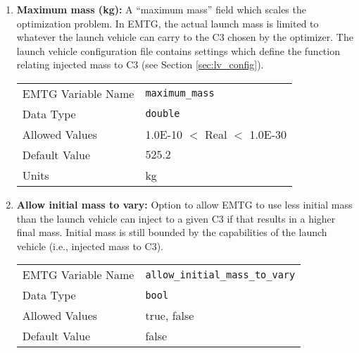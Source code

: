 \begin{enumerate}
    \item \textbf{Maximum mass (kg):} A ``maximum mass'' field which scales the optimization problem. In \ac{EMTG}, the actual launch mass is limited to whatever the launch vehicle can carry to the C3 chosen by the optimizer. The launch vehicle configuration file contains settings which define the function relating injected mass to C3 (see Section \ref{sec:lv_config}).
    \begin{table}[H]
        \hspace{2cm}
        \begin{tabular}{lp{5cm}}
        \ac{EMTG} Variable Name & \verb|maximum_mass| \\
        Data Type & \verb|double| \\
        Allowed Values & 1.0E-10 $<$ Real $<$ 1.0E-30 \\
        Default Value & $525.2$ \\
        Units & kg
        \end{tabular}
    \end{table}
    
    \item \textbf{Allow initial mass to vary:} Option to allow \ac{EMTG} to use less initial mass than the launch vehicle can inject to a given C3 if that results in a higher final mass. Initial mass is still bounded by the capabilities of the launch vehicle (i.e., injected mass to C3).
    \begin{table}[H]
        \hspace{2cm}
        \begin{tabular}{lp{5cm}}
        \ac{EMTG} Variable Name & \verb|allow_initial_mass_to_vary| \\
        Data Type & \verb|bool| \\
        Allowed Values & true, false \\
        Default Value & false \\
        \end{tabular}
    \end{table}
    

\end{enumerate}
